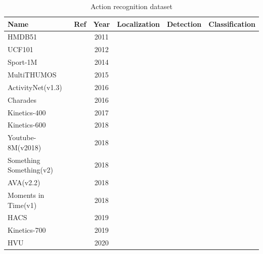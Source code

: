 \documentclass[a4paper]{article}
\begin{document}
\begin{table}[h]
	\centering
	\caption{Action recognition dataset}
	\renewcommand{\arraystretch}{1.5}
	\begin{tabular}{l|c|c|c c c}
		\toprule
		Name                    & Ref                       & Year & Localization & Detection & Classification\\
		\hline
		HMDB51                  & \cite{HMDB51}             & 2011 &              &           & \cmark         \\
		UCF101                  & \cite{UCF101}             & 2012 &              &           & \cmark         \\
		Sport-1M                & \cite{Sports1M}           & 2014 &              &           & \cmark         \\
		MultiTHUMOS             & \cite{Multi-THUMOS}       & 2015 & \cmark       &           &                \\
		ActivityNet(v1.3)       & \cite{ActivityNet}        & 2016 & \cmark       &           & \cmark         \\ 
		Charades                & \cite{Charades}           & 2016 & \cmark       &           & \cmark         \\
		Kinetics-400            & \cite{Kinetics-400}       & 2017 &              &           & \cmark         \\
		Kinetics-600            & \cite{Kinetics-600}       & 2018 &              &           & \cmark         \\
		Youtube-8M(v2018)       & \cite{YouTube8M}          & 2018 &              &           & \cmark         \\
		Something Something(v2) & \cite{SomethingSomething} & 2018 &              &           & \cmark         \\
		AVA(v2.2)               & \cite{AVA}                & 2018 &              & \cmark    &                \\
		Moments in Time(v1)     & \cite{MomentsinTime}      & 2018 &              &           & \cmark         \\
		HACS                    & \cite{HACS}               & 2019 & \cmark       &           & \cmark         \\
		Kinetics-700            & \cite{Kinetics-700}       & 2019 &              &           & \cmark         \\
		HVU                     & \cite{HVU}                & 2020 &              &           & \cmark         \\

\end{tabular}
\end{table}
\end{document}
